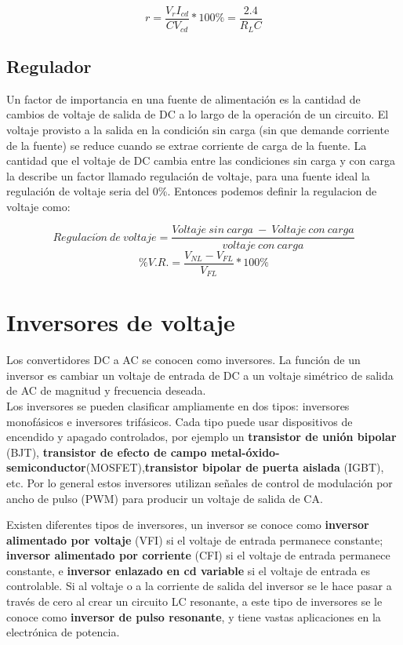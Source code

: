 \begin{equation}
r=\dfrac{V_{r}I_{cd}}{CV_{cd}}*100\%=\dfrac{2.4}{R_{L}C}
\end{equation}

\subsection{Regulador}

Un factor de importancia en una fuente de alimentación es la cantidad de cambios de voltaje de salida de DC a lo largo de la operación de un circuito. El voltaje provisto a la salida en la condición sin carga (sin que demande corriente de la fuente) se reduce cuando se extrae corriente de carga de la fuente. La cantidad que el voltaje de DC cambia entre las condiciones sin carga y con carga la describe un factor llamado regulación de voltaje, para una fuente ideal la regulación de voltaje seria del 0\%. Entonces podemos definir la regulacion de voltaje como:
 

$$Regulaci\acute{o}n\:de\: voltaje = \dfrac{Voltaje\: sin \:carga \:-\: Voltaje\: con\: carga}{voltaje\: con\: carga}$$
\begin{equation} 
 \%V.R. = \dfrac{V_{NL}-V_{FL}}{V_{FL}}*100\%
\end{equation}





\newpage

\section{Inversores de voltaje}

Los convertidores DC a AC se conocen como inversores. La función de un inversor es cambiar un voltaje de entrada de DC a un voltaje simétrico de salida de AC de magnitud y frecuencia deseada. \\

Los inversores se pueden clasificar ampliamente en dos tipos: inversores monofásicos e inversores trifásicos. Cada tipo puede usar dispositivos de encendido y apagado controlados, por ejemplo un \textbf{transistor de unión bipolar} (BJT), \textbf{transistor de efecto de campo metal-óxido-semiconductor}(MOSFET),\textbf{transistor bipolar de puerta aislada} (IGBT), etc. Por lo general estos inversores utilizan señales de control de modulación por ancho de pulso  (PWM) para producir un voltaje de salida de CA.

Existen diferentes tipos de inversores, un inversor se conoce como \textbf{inversor alimentado por voltaje} (VFI) si el voltaje de entrada permanece constante; \textbf{inversor alimentado por corriente} (CFI) si el voltaje de entrada permanece constante, e \textbf{inversor enlazado en cd variable} si el voltaje de entrada es controlable. Si al voltaje o a la corriente de salida del inversor se le hace pasar a través de cero al crear un circuito LC resonante, a este tipo de inversores se le conoce como \textbf{inversor de pulso resonante}, y tiene vastas aplicaciones en la electrónica de potencia. \\

